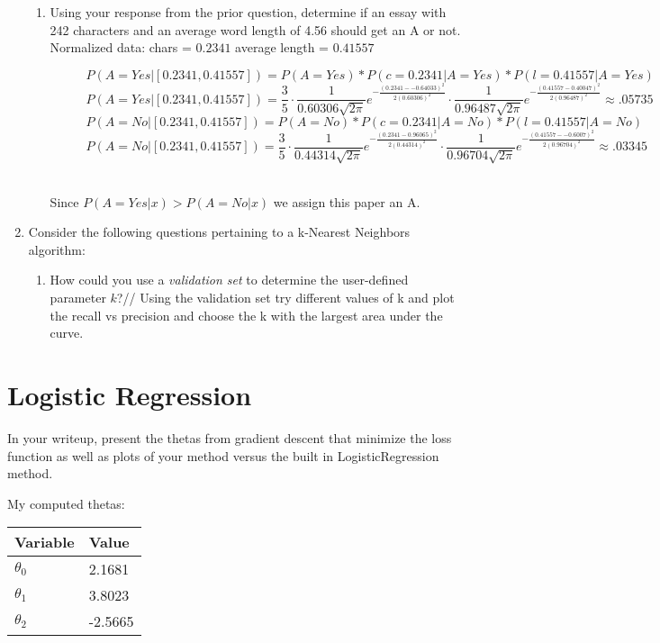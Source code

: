 \documentclass[12pt]{article}
\begin{document}
\begin{enumerate}
\begin{enumerate}
	\item Using your response from the prior question, determine if an essay with 242 characters and an average word length of 4.56 should get an A or not.\\
    Normalized data: chars = $0.2341$ average length = $0.41557$
    \begin{figure}[h!]
    $$P(A=Yes | [0.2341,0.41557]) = P(A=Yes)*P(c=0.2341|A=Yes)*P(l=0.41557|A=Yes)$$
    $$P(A=Yes | [0.2341,0.41557]) = \frac{3}{5}\cdot\frac{1}{0.60306\sqrt{2\pi}}e^{-\frac{(0.2341 - -0.64033)^2}{2(0.60306)^2}}\cdot\frac{1}{0.96487\sqrt{2\pi}}e^{-\frac{(0.41557 - 0.40047)^2}{2(0.96487)^2}} \approx .05735$$
    $$P(A=No | [0.2341,0.41557]) = P(A=No)*P(c=0.2341|A=No)*P(l=0.41557|A=No)$$
    $$P(A=No | [0.2341,0.41557]) = \frac{3}{5}\cdot\frac{1}{0.44314\sqrt{2\pi}}e^{-\frac{(0.2341 - 0.96065)^2}{2(0.44314)^2}}\cdot\frac{1}{0.96704\sqrt{2\pi}}e^{-\frac{(0.41557 - -0.6007)^2}{2(0.96704)^2}} \approx .03345$$
    \end{figure}\\
    Since $P(A=Yes | x) > P(A=No | x)$ we assign this paper an A.
	\end{enumerate}
\item Consider the following questions pertaining to a k-Nearest Neighbors algorithm:
	\begin{enumerate}
	\item How could you use a \emph{validation set} to determine the user-defined parameter $k$?//
    Using the validation set try different values of k and plot the recall vs precision and choose the k with the largest area under the curve.
	\end{enumerate}
\end{enumerate}


\newpage
\section{Logistic Regression}\label{naive}
In your writeup, present the thetas from gradient descent that minimize the loss function as well as plots of your method versus the built in LogisticRegression method.

My computed thetas:
\begin{tabular}{|l|l|}
\hline
Variable   & Value  \\
\hline
$\theta_0$ & 2.1681 \\
$\theta_1$ & 3.8023 \\
$\theta_2$ &-2.5665 \\
\hline
\end{tabular}
\end{document}
